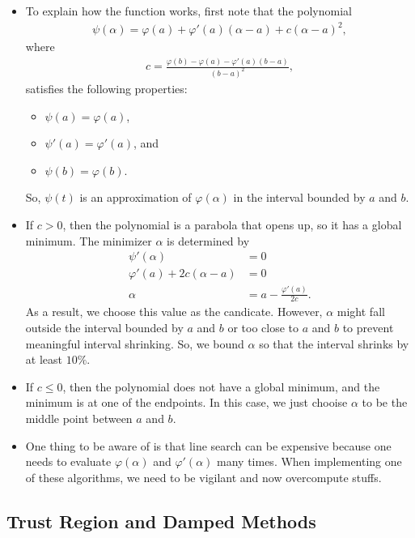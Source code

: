 \documentclass[10pt]{article}
\begin{document}
\begin{itemize}
    \item To explain how the function works, first note that the polynomial
    \begin{align*}
        \psi(\alpha) = \varphi(a) + \varphi'(a)(\alpha-a) + c(\alpha-a)^2,
    \end{align*}
    where
    \begin{align*}
        c = \frac{\varphi(b) - \varphi(a) - \varphi'(a)(b-a)}{(b-a)^2},
    \end{align*}
    satisfies the following properties:
    \begin{itemize}
        \item $\psi(a) = \varphi(a)$,
        \item $\psi'(a) = \varphi'(a)$, and
        \item $\psi(b) = \varphi(b)$.
    \end{itemize}
    So, $\psi(t)$ is an approximation of $\varphi(\alpha)$ in the interval bounded by $a$ and $b$.

    \item If $c > 0$, then the polynomial is a parabola that opens up, so it has a global minimum. The minimizer $\alpha$ is determined by
    \begin{align*}
        \psi'(\alpha) &= 0 \\
        \varphi'(a) + 2c(\alpha - a) &= 0  \\
        \alpha &= a - \frac{\varphi'(a)}{2c}.
    \end{align*}
    As a result, we choose this value as the candicate. However, $\alpha$ might fall outside the interval bounded by $a$ and $b$ or too close to $a$ and $b$ to prevent meaningful interval shrinking. So, we bound $\alpha$ so that the interval shrinks by at least $10\%$.

    \item If $c \leq 0$, then the polynomial does not have a global minimum, and the minimum is at one of the endpoints. In this case, we just chooise $\alpha$ to be the middle point between $a$ and $b$.
    
    \item One thing to be aware of is that line search can be expensive because one needs to evaluate $\varphi(\alpha)$ and $\varphi'(\alpha)$ many times. When implementing one of these algorithms, we need to be vigilant and now overcompute stuffs.
\end{itemize}

\subsection{Trust Region and Damped Methods} \label{sec:trust-region-and-damped-methods}
\end{document}
